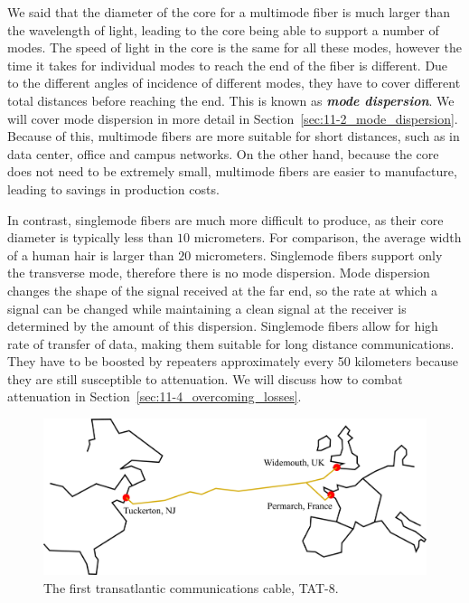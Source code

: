 We said that the diameter of the core for a multimode fiber is much larger than the wavelength of light, leading to the core being able to support a number of modes.
The speed of light in the core is the same for all these modes, however the time it takes for individual modes to reach the end of the fiber is different.
Due to the different angles of incidence of different modes, they have to cover different total distances before reaching the end.
This is known as \textit{\textbf{mode dispersion}}.
We will cover mode dispersion in more detail in Section~\ref{sec:11-2_mode_dispersion}.
Because of this, multimode fibers are more suitable for short distances, such as in data center,  office and campus networks.
On the other hand, because the core does not need to be extremely small, multimode fibers are easier to manufacture, leading to savings in production costs.

In contrast, singlemode fibers are much more difficult to produce, as their core diameter is typically less than $10$ micrometers.
For comparison, the average width of a human hair is larger than $20$ micrometers.
Singlemode fibers support only the transverse mode, therefore there is no mode dispersion.
Mode dispersion changes the shape of the signal received at the far end, so the rate at which a signal can be changed while maintaining a clean signal at the receiver is determined by the amount of this dispersion.
Singlemode fibers allow for high rate of transfer of data, making them suitable for long distance communications.
They have to be boosted by repeaters approximately every 50 kilometers because they are still susceptible to attenuation.
We will discuss how to combat attenuation in Section~\ref{sec:11-4_overcoming_losses}.

\begin{figure}[t]
    \centering
    \includegraphics[width=\textwidth]{lesson7/7-4_TAT8.pdf}
    \caption[TAT-8]{The first transatlantic communications cable, TAT-8.}
    \label{fig:7-4_TAT8}
\end{figure}

